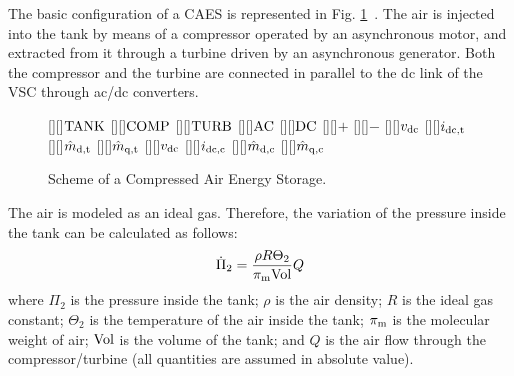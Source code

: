 \documentclass[journal, a4paper]{IEEEtran}
\begin{document}
The basic configuration of a CAES is
represented in Fig. \ref{fig:caes}~\cite{Vongmanee:09}.  The air is
injected into the tank by means of a compressor operated by an
asynchronous motor, and extracted from it through a turbine driven by
an asynchronous generator.  Both the compressor and the turbine are
connected in parallel to the dc link of the VSC through ac/dc
converters.
\begin{figure}[htb]
  \begin{center}
    [][]{\huge $\rm TANK$}
    [][]{\huge $\rm COMP$}
    [][]{\huge $\rm TURB$}
    [][]{\LARGE $\rm AC$}
    [][]{\LARGE $\rm DC$}
    \psfrag{+}[][]{\Large $+$}
    \psfrag{-}[][]{\Large $-$}
    [][]{\Huge $v_{\rm dc}$}
    [][]{\Huge $i_{\rm dc, t}$}
    [][]{\Huge $\hat{m}_{\rm d,t}$}
    [][]{\Huge $\hat{m}_{\rm q,t}$}
    [][]{\Huge $v_{\rm dc}$}
    [][]{\Huge $i_{\rm dc, c}$}
    [][]{\Huge $\hat{m}_{\rm d,c}$}
    [][]{\Huge $\hat{m}_{\rm q,c}$}
\caption{Scheme of a Compressed Air Energy Storage.}
    \label{fig:caes}
  \end{center}
\vspace{-0.4cm}
\end{figure}

The air is modeled as an ideal gas.  Therefore, the variation
of the pressure inside the tank can be calculated as follows:
\begin{equation}
  \dot{\Pi}_{2}=\frac{\rho R\Theta_{2}}{{\pi_{\rm m} \rm Vol}} Q
  \label{Pressure}
\end{equation}
where $\Pi_{2}$ is the pressure inside the tank; $\rho$ is the air
density; $R$ is the ideal gas constant; $\Theta_{2}$ is the
temperature of the air inside the tank; $\pi_{\rm m}$ is the molecular
weight of air; $\rm Vol$ is the volume of the tank; and $Q$ is the air
flow through the compressor/turbine (all quantities are assumed in
absolute value).
\end{document}
